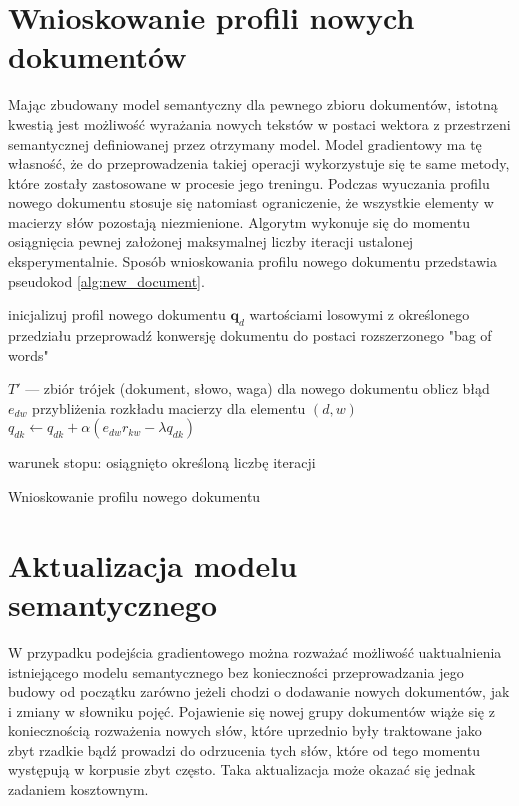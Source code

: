 \documentclass{pracamgr}
\begin{document}
\section{Wnioskowanie profili nowych dokumentów}

Mając zbudowany model semantyczny dla pewnego zbioru dokumentów, istotną kwestią jest możliwość wyrażania nowych tekstów w postaci wektora z przestrzeni semantycznej definiowanej przez otrzymany model. Model gradientowy ma tę własność, że do przeprowadzenia takiej operacji wykorzystuje się te same metody, które zostały zastosowane w procesie jego treningu. Podczas wyuczania profilu nowego dokumentu stosuje się natomiast ograniczenie, że wszystkie elementy w macierzy słów pozostają niezmienione. Algorytm wykonuje się do momentu osiągnięcia pewnej założonej maksymalnej liczby iteracji ustalonej eksperymentalnie. Sposób wnioskowania profilu nowego dokumentu przedstawia pseudokod \ref{alg:new_document}.

\begin{algorithm}

inicjalizuj profil nowego dokumentu $\mathbf{q}_d$ wartościami losowymi z określonego przedziału\;
przeprowadź konwersję dokumentu do postaci rozszerzonego "bag of words"\;
 {
    $T'$ --- zbiór trójek (dokument, słowo, waga) dla nowego dokumentu\;
     {
        oblicz błąd $e_{dw}$ przybliżenia rozkładu macierzy dla elementu $(d, w)$\;
         { 
            $q_{dk} \gets q_{dk} + \alpha (e_{dw} r_{kw} - \lambda q_{dk})$\;
        }
    }
    
    warunek stopu: osiągnięto określoną liczbę iteracji
}

\caption{Wnioskowanie profilu nowego dokumentu}
\label{alg:new_document}
\end{algorithm}

\section{Aktualizacja modelu semantycznego}
W przypadku podejścia gradientowego można rozważać możliwość uaktualnienia istniejącego modelu semantycznego bez konieczności przeprowadzania jego budowy od początku zarówno jeżeli chodzi o dodawanie nowych dokumentów, jak i zmiany w słowniku pojęć. Pojawienie się nowej grupy dokumentów wiąże się z koniecznością rozważenia nowych słów, które uprzednio były traktowane jako zbyt rzadkie bądź prowadzi do odrzucenia tych słów, które od tego momentu występują w korpusie zbyt często. Taka aktualizacja może okazać się jednak zadaniem kosztownym. 
\end{document}
